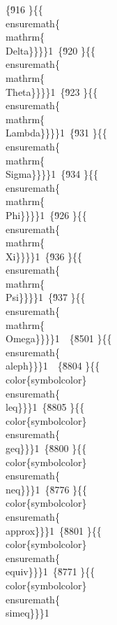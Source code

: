 {\{\u916 \}\{\{\\ensuremath\{\\mathrm\{\\Delta\}\}\}\}1\
\{\u920 \}\{\{\\ensuremath\{\\mathrm\{\\Theta\}\}\}\}1\
\{\u923 \}\{\{\\ensuremath\{\\mathrm\{\\Lambda\}\}\}\}1\
\{\u931 \}\{\{\\ensuremath\{\\mathrm\{\\Sigma\}\}\}\}1\
\{\u934 \}\{\{\\ensuremath\{\\mathrm\{\\Phi\}\}\}\}1\
\{\u926 \}\{\{\\ensuremath\{\\mathrm\{\\Xi\}\}\}\}1\
\{\u936 \}\{\{\\ensuremath\{\\mathrm\{\\Psi\}\}\}\}1\
\{\u937 \}\{\{\\ensuremath\{\\mathrm\{\\Omega\}\}\}\}1\
\
\{\u8501 \}\{\{\\ensuremath\{\\aleph\}\}\}1\
\
\{\u8804 \}\{\{\\color\{symbolcolor\}\\ensuremath\{\\leq\}\}\}1\
\{\u8805 \}\{\{\\color\{symbolcolor\}\\ensuremath\{\\geq\}\}\}1\
\{\u8800 \}\{\{\\color\{symbolcolor\}\\ensuremath\{\\neq\}\}\}1\
\{\u8776 \}\{\{\\color\{symbolcolor\}\\ensuremath\{\\approx\}\}\}1\
\{\u8801 \}\{\{\\color\{symbolcolor\}\\ensuremath\{\\equiv\}\}\}1\
\{\u8771 \}\{\{\\color\{symbolcolor\}\\ensuremath\{\\simeq\}\}\}1\
}

